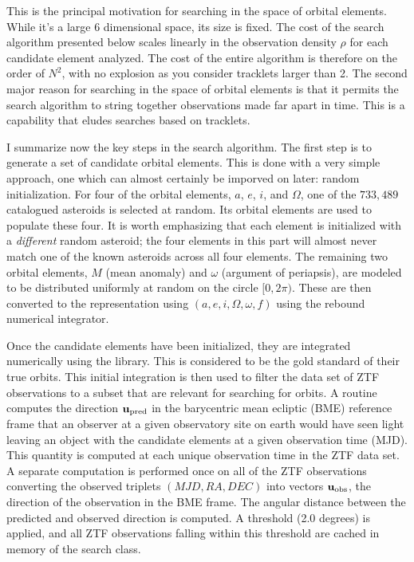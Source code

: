 This is the principal motivation for searching in the space of orbital elements.
While it's a large 6 dimensional space, its size is fixed.
The cost of the search algorithm presented below scales linearly in the observation density $\rho$ for each candidate element analyzed.
The cost of the entire algorithm is therefore on the order of $N^2$, with no explosion as you consider tracklets larger than 2.
The second major reason for searching in the space of orbital elements is that it permits the search algorithm to string together observations made far apart in time.
This is a capability that eludes searches based on tracklets.

I summarize now the key steps in the search algorithm.
The first step is to generate a set of candidate orbital elements.
This is done with a very simple approach, one which can almost certainly be imporved on later: random initialization.
For four of the orbital elements, $a$, $e$, $i$, and $\Omega$, one of the $733,489$ catalogued asteroids is selected at random.
Its orbital elements are used to populate these four.
It is worth emphasizing that each element is initialized with a \textit{different} random asteroid;
the four elements in this part will almost never match one of the known asteroids across all four elements.
The remaining two orbital elements, $M$ (mean anomaly) and $\omega$ (argument of periapsis), 
are modeled to be distributed uniformly at random on the circle $[0, 2 \pi)$.
These are then converted to the representation using $(a, e, i, \Omega, \omega, f)$ using the rebound numerical integrator.

Once the candidate elements have been initialized, they are integrated numerically using the  library.
This is considered to be the gold standard of their true orbits.
This initial integration is then used to filter the data set of ZTF observations to a subset that are relevant for searching for orbits.
A routine computes the direction $\mathbf{u}_{\mathrm{pred}}$ in the barycentric mean ecliptic (BME) reference frame
that an observer at a given observatory site on earth would have seen light leaving an object with the candidate elements at a given observation time (MJD).
This quantity is computed at each unique observation time in the ZTF data set.
A separate computation is performed once on all of the ZTF observations converting the observed triplets $(MJD, RA, DEC)$
into vectors $\mathbf{u}_{\mathrm{obs}}$, the direction of the observation in the BME frame.
The angular distance between the predicted and observed direction is computed.
A threshold (2.0 degrees) is applied, and all ZTF observations falling within this threshold are cached in memory of the search class.

